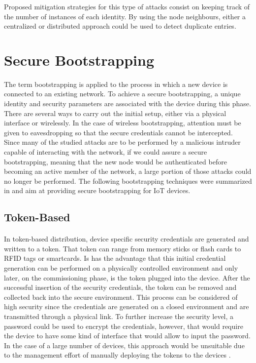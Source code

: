 Proposed mitigation strategies for this type of attacks consist on keeping track of the number of instances of each identity. By using the node neighbours, either a centralized or distributed approach could be used to detect duplicate entries.

\section{Secure Bootstrapping}
\label{sec:secure_bootstrapping}
\paragraph{}
The term bootstrapping is applied to the process in which a new device is connected to an existing network. To achieve a secure bootstrapping, a unique identity and security parameters are associated with the device during this phase. There are several ways to carry out the initial setup, either via a physical interface or wirelessly. In the case of wireless bootstrapping, attention must be given to eavesdropping so that the secure credentials cannot be intercepted.\\
Since many of the studied attacks are to be performed by a malicious intruder capable of interacting with the network, if we could assure a secure bootstrapping, meaning that the new node would be authenticated before becoming an active member of the network, a large portion of those attacks could no longer be performed. The following bootstrapping techniques were summarized in \cite{Fischer2012} and aim at providing secure bootstrapping for \gls{IoT} devices.

\subsection{Token-Based}
\paragraph{}
In token-based distribution, device specific security credentials are generated and written to a token. That token can range from memory sticks or flash cards to \gls{RFID} tags or smartcards. Is has the advantage that this initial credential generation can be performed on a physically controlled environment and only later, on the commissioning phase, is the token plugged into the device. After the successful insertion of the security credentials, the token can be removed and collected back into the secure environment. This process can be considered of high security since the credentials are generated on a closed environment and are transmitted through a physical link. To further increase the security level, a password could be used to encrypt the credentials, however, that would require the device to have some kind of interface that would allow to input the password. In the case of a large number of devices, this approach would be unsuitable due to the management effort of manually deploying the tokens to the devices \cite{Fischer2012}.


